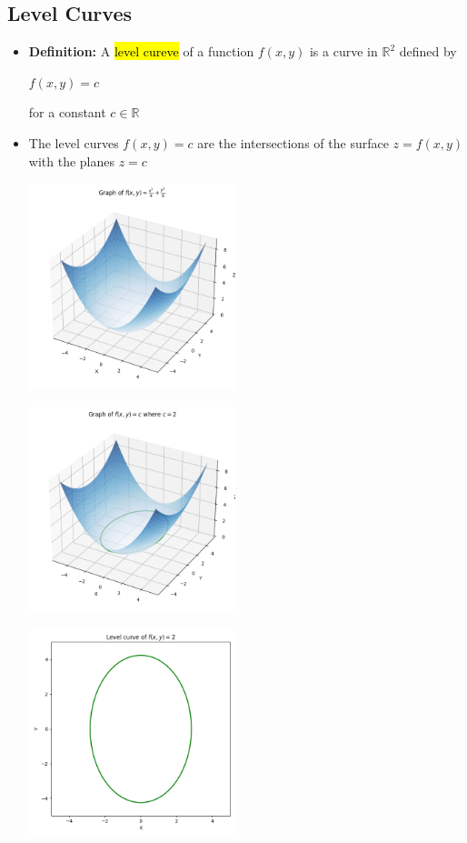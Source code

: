 \documentclass{article}
\begin{document}
  \subsection*{Level Curves}
  \begin{itemize}
  	\item \textbf{Definition:} A \hl{level cureve} of a function $f(x,y)$ is a curve in $\mathbb{R}^2$ defined by 
  	\begin{center}
  		$f(x,y) = c$
  	\end{center}
  	for a constant $c \in \mathbb{R}$

  	\item The level curves $f(x,y) = c$ are the intersections of the surface $z = f(x,y)$ with the planes $z=c$

	\includegraphics[width=\linewidth, height=6cm]{Graphs/w8_2.png}

	\includegraphics[width=\linewidth, height=6cm]{Graphs/w8_3.png}

	\includegraphics[width=\linewidth, height=6cm]{Graphs/w8_4.png}
  \end{itemize}
\end{document}
